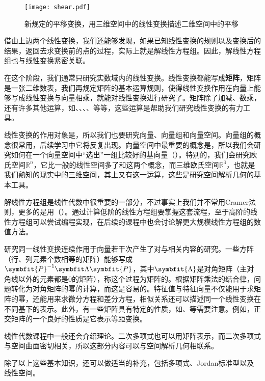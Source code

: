 \begin{figure}[h]
    \centering
    \texttt{[image: shear.pdf]}
    \caption{新规定的平移变换，用三维空间中的线性变换描述二维空间中的平移}
\end{figure}

借由上边两个线性变换，我们还能够发现，如果已知线性变换的规则以及变换后的结果，返回去求变换前的点的过程，实际上就是解线性方程组。因此，解线性方程组也与线性变换紧密关联。

在这个阶段，我们通常只研究实数域内的线性变换。线性变换都能写成\textbf{矩阵}，矩阵是一张二维数表，我们再规定矩阵的基本运算规则，使得线性变换作用在向量上能够写成线性变换与向量相乘，就能对线性变换进行研究了。矩阵除了加减、数乘，还有许多其他运算，如、、、、等等，这些运算是帮助我们研究线性变换的有力工具。

线性变换的作用对象是，所以我们也要研究向量、向量组和向量空间。向量组的概念很常用，后续学习中它将反复出现。向量空间中最重要的概念是，所以我们会研究如何在一个向量空间中“选出”一组比较好的基向量（）。特别的，我们会研究欧氏空间$\mathbb{R}^n$，它比一般的线性空间多了和这两个概念，而三维欧氏空间$\mathbb{R}^3$，也就是我们熟知的现实中的三维空间，其上又有这一运算，这些是研究空间解析几何的基本工具。

解线性方程组是线性代数中很重要的一部分，不过事实上我们并不常用Cramer法则，更多的是用（）。通过计算低阶的线性方程组要掌握这套流程，至于高阶的线性方程组可以尝试编程实现，在后续的课程中也会讨论解更大规模线性方程组的数值方法。

研究同一线性变换连续作用于向量若干次产生了对与相关内容的研究。一些方阵（行、列元素个数相等的矩阵）能够写成$\symbfit{P}^{-1}\symbfit\Lambda \symbfit{P}$，其中$\symbfit{\Lambda}$是对角矩阵（主对角线以外的元素都是$0$的矩阵），称这个过程为矩阵的。根据矩阵乘法的结合律，问题转化为对角矩阵的幂的计算，而这是容易的。特征值与特征向量不仅能用于求矩阵的幂，还能用来求微分方程和差分方程，相似关系还可以描述同一个线性变换在不同基下的表示。此外，有一些矩阵具有特定的性质，如、等需要注意。例如，正交矩阵的一个良好的性质是它表示等距变换。

线性代数课程中一般还会介绍理论。二次多项式也可以用矩阵表示，而二次多项式与空间曲面密切相关，所以这部分内容可以与空间解析几何相联系。


除了以上这些基本知识，还可以做适当的补充，包括多项式、Jordan标准型以及线性空间。

